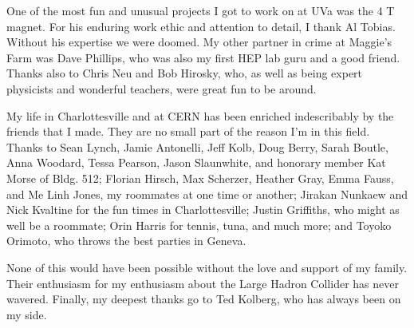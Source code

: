\documentclass[dissertation.tex]{subfiles}
\begin{document}
One of the most fun and unusual projects I got to work on at UVa was the 4 T magnet.  For his enduring work ethic and attention to detail, I thank Al Tobias.  Without his expertise we were doomed.  My other partner in crime at Maggie's Farm was Dave Phillips, who was also my first HEP lab guru and a good friend.  Thanks also to Chris Neu and Bob Hirosky, who, as well as being expert physicists and wonderful teachers, were great fun to be around.

My life in Charlottesville and at CERN has been enriched indescribably by the friends that I made.  They are no small part of the reason I'm in this field.  Thanks to Sean Lynch, Jamie Antonelli, Jeff Kolb, Doug Berry, Sarah Boutle, Anna Woodard, Tessa Pearson, Jason Slaunwhite, and honorary member Kat Morse of Bldg. 512; Florian Hirsch, Max Scherzer, Heather Gray, Emma Fauss, and Me Linh Jones, my roommates at one time or another; Jirakan Nunkaew and Nick Kvaltine for the fun times in Charlottesville; Justin Griffiths, who might as well be a roommate; Orin Harris for tennis, tuna, and much more; and Toyoko Orimoto, who throws the best parties in Geneva.

None of this would have been possible without the love and support of my family.  Their enthusiasm for my enthusiasm about the Large Hadron Collider has never wavered.  Finally, my deepest thanks go to Ted Kolberg, who has always been on my side.

\clearpage
\end{document}
